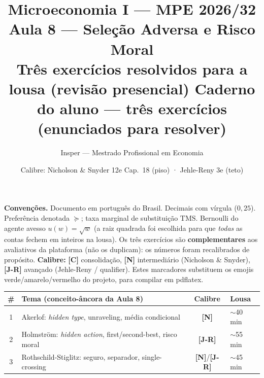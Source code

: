 \documentclass[11pt,a4paper]{article}
\title{\textbf{\textcolor{insper}{Microeconomia I — MPE 2026/32}}\\[4pt]
\large Aula 8 — Seleção Adversa e Risco Moral\\[2pt]
\normalsize \ifsolucao Três exercícios resolvidos para a lousa (revisão presencial)%
\else Caderno do aluno — três exercícios (enunciados para resolver)\fi}
\author{Insper — Mestrado Profissional em Economia}
\date{Calibre: Nicholson \& Snyder 12e Cap.~18 (piso) · Jehle-Reny 3e (teto)}
\newcommand{\calY}{\textbf{\textcolor{amarelo}{[N]}}} %
\newcommand{\calR}{\textbf{\textcolor{verm}{[J-R]}}}  %
\newcommand{\calG}{\textbf{\textcolor{verde}{[C]}}}   %
\newcommand{\TMS}{\text{TMS}}
\newcommand{\dc}[2]{#1{,}#2}
\newif\ifsolucao
\begin{document}
\maketitle

\noindent\textbf{Convenções.} Documento em português do Brasil. Decimais com vírgula
($\dc{0}{25}$). Preferência denotada $\succeq$; taxa marginal de substituição $\TMS$.
Bernoulli do agente avesso $u(w)=\sqrt{w}$ (a raiz quadrada foi escolhida para que
\emph{todas} as contas fechem em inteiros na lousa). Os três exercícios são
\textbf{complementares} aos avaliativos da plataforma (não os duplicam): os números
foram recalibrados de propósito. \textbf{Calibre:} \calG{} consolidação,
\calY{} intermediário (Nicholson \& Snyder), \calR{} avançado (Jehle-Reny / qualifier).
Estes marcadores substituem os emojis verde/amarelo/vermelho do projeto, para compilar em pdflatex.

\ifsolucao
\smallskip
\noindent\textbf{\textcolor{mundo}{Como ler este material.}} A turma do MPE é heterogênea:
há advogados, engenheiros e gente de negócios que nunca viu microeconomia avançada. Por
isso a versão-solução traz, ao lado da álgebra, \textbf{caixas azuis ``Em palavras''}.
Elas são \emph{andaime de leitura para estudo em casa}: explicam cada passo em português
comum, definem o jargão na primeira aparição e traduzem cada resultado para a intuição.
Na lousa, o professor escreve apenas a álgebra (a caixa azul \emph{não} consome tempo de
quadro); você usa a prosa azul depois, sozinho, para destravar o que ficou opaco. As
\textbf{caixas vermelhas} (``Comentário pedagógico'') são a leitura do professor em 5 passos
— mantêm o registro técnico.
\fi

\medskip
\begin{center}
\begin{tabular}{@{}clcl@{}}
\toprule
\# & Tema (conceito-âncora da Aula 8) & Calibre & Lousa \\
\midrule
1 & Akerlof: \emph{hidden type}, unraveling, média condicional & \calY & $\sim$40 min \\
2 & Holmström: \emph{hidden action}, first/second-best, risco moral & \calR & $\sim$55 min \\
3 & Rothschild-Stiglitz: seguro, separador, single-crossing & \calY/\calR & $\sim$45 min \\
\bottomrule
\end{tabular}
\end{center}

\hrulefill

\end{document}
